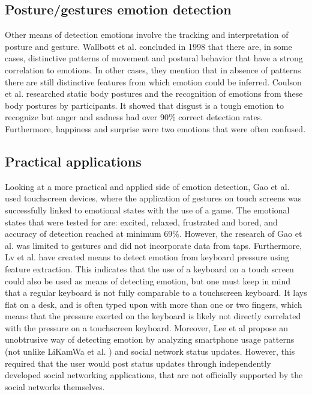\documentclass{sigchi}
\begin{document}
\subsection{Posture/gestures emotion detection}
Other means of detection emotions involve the tracking and interpretation of posture and gesture. Wallbott et al. \cite{Wallbott1998} concluded in 1998 that there are, in some cases, distinctive patterns of movement and postural behavior that have a strong correlation to emotions. In other cases, they mention that in absence of patterns there are still distinctive features from which emotion could be inferred. Coulson et al. \cite{Coulson2004} researched static body postures and the recognition of emotions from these body postures by participants. It showed that disgust is a tough emotion to recognize but anger and sadness had over 90\% correct detection rates. Furthermore, happiness and surprise were two emotions that were often confused. 

\subsection{Practical applications} %
\label{sub:practical_applications}
Looking at a more practical and applied side of emotion detection, Gao et al. \cite{Gao2012} used touchscreen devices, where the application of gestures on touch screens was successfully linked to emotional states with the use of a game. The emotional states that were tested for are: excited, relaxed, frustrated and bored, and accuracy of detection reached at minimum 69\%. However, the research of Gao et al. was limited to gestures and did not incorporate data from taps. Furthermore, Lv et al. \cite{H.R.LvZ.L.LinW.J.Yin2008} have created means to detect emotion from keyboard pressure using feature extraction. This indicates that the use of a keyboard on a touch screen could also be used as means of detecting emotion, but one must keep in mind that a regular keyboard is not fully comparable to a touchscreen keyboard. It lays flat on a desk, and is often typed upon with more than one or two fingers, which means that the pressure exerted on the keyboard is likely not directly correlated with the pressure on a touchscreen keyboard. Moreover, Lee et al \cite{Lee2012} propose an unobtrusive way of detecting emotion by analyzing smartphone usage patterns (not unlike LiKamWa et al. \cite{Likamwa2013}) and social network status updates. However, this required that the user would post status updates through independently developed social networking applications, that are not officially supported by the social networks themselves.
\end{document}
